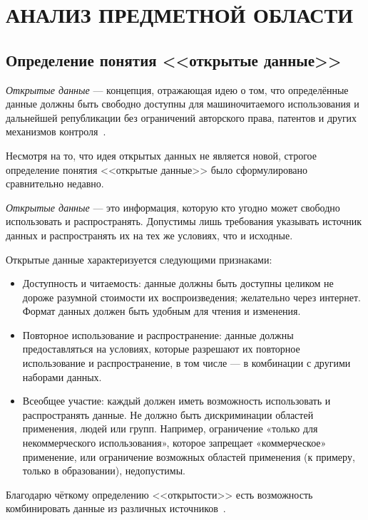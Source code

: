 \section[Анализ предметной области]{АНАЛИЗ ПРЕДМЕТНОЙ ОБЛАСТИ}

\subsection{Определение понятия <<открытые данные>>}

\textit{Открытые данные} --- концепция, отражающая идею о том, что определённые данные
должны быть свободно доступны для машиночитаемого использования и дальнейшей републикации без
ограничений авторского права, патентов и других механизмов контроля~\cite{wiki_opendata}.

Несмотря на то, что идея открытых данных не является новой, строгое определение понятия
<<открытые данные>> было сформулировано сравнительно недавно.

\textit{Открытые данные} --- это информация, которую кто угодно может свободно использовать и распространять.
Допустимы лишь требования указывать источник данных и распространять их на тех же условиях,
что и исходные.

Открытые данные характеризуется следующими признаками:
\begin{itemize}

\item
Доступность и читаемость: данные должны быть доступны целиком не дороже
разумной стоимости их воспроизведения; желательно через интернет.
Формат данных должен быть удобным для чтения и изменения.

\item
Повторное использование и распространение: данные должны предоставляться на условиях,
которые разрешают их повторное использование и распространение,
в том числе --- в комбинации с другими наборами данных.

\item
Всеобщее участие: каждый должен иметь возможность использовать и распространять данные.
Не должно быть дискриминации областей применения, людей или групп.
Например, ограничение «только для некоммерческого использования»,
которое запрещает «коммерческое» применение, или ограничение возможных областей применения
(к примеру, только в образовании), недопустимы.

\end{itemize}

Благодарю чёткому определению <<открытости>> есть возможность комбинировать данные
из различных источников~\cite{opendatahandbook_open_data}.


